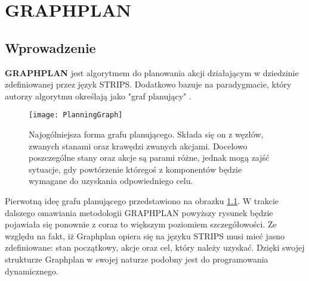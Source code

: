 \chapter{GRAPHPLAN}
\thispagestyle{chapterBeginStyle}
\label{GRAPHPLANRozdzial}

\section{Wprowadzenie}
    \textbf{GRAPHPLAN} jest algorytmem do planowania akcji działającym w dziedzinie zdefiniowanej
    przez język STRIPS. Dodatkowo bazuje na paradygmacie, który autorzy algorytmu określają jako "graf planujący" \cite{GRAPHPLAN}.
    \begin{figure}[H]
        \texttt{[image: PlanningGraph]}
        \centering
        \caption{Najogólniejsza forma grafu planującego. Składa się on z węzłów, zwanych stanami oraz krawędzi zwanych akcjami. Docelowo poszczególne 
        stany oraz akcje są parami różne, jednak mogą zajść sytuacje, gdy powtórzenie któregoś z komponentów będzie wymagane do uzyskania odpowiedniego
        celu.}
        \label{PlanningGraph}
    \end{figure}
    Pierwotną ideę grafu planującego przedstawiono na obrazku \ref{PlanningGraph}. W trakcie dalszego omawiania metodologii GRAPHPLAN powyższy rysunek
    będzie pojawiała się ponownie z coraz to większym poziomiem szczegółowości.
    Ze względu na fakt, iż Graphplan opiera się na języku STRIPS musi mieć jasno zdefiniowane: stan początkowy, akcje oraz cel, który należy uzyskać.
    Dzięki swojej strukturze Graphplan w swojej naturze podobny jest do programowania dynamicznego.


